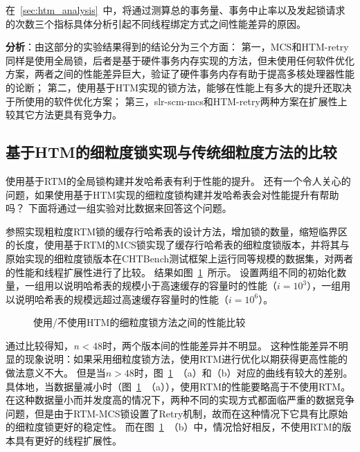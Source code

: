 在~\ref{sec:htm_analysis}~中，将通过测算总的事务量、事务中止率以及发起锁请求的次数三个指标具体分析引起不同线程绑定方式之间性能差异的原因。

\textbf{分析}：由这部分的实验结果得到的结论分为三个方面：
第一，MCS和HTM-retry同样是使用全局锁，后者是基于硬件事务内存实现的方法，但未使用任何软件优化方案，两者之间的性能差异巨大，验证了硬件事务内存有助于提高多核处理器性能的论断；
第二，使用基于HTM实现的锁方法，能够在性能上有多大的提升还取决于所使用的软件优化方案；
第三，slr-scm-mcs和HTM-retry两种方案在扩展性上较其它方法更具有竞争力。


\subsection{基于HTM的细粒度锁实现与传统细粒度方法的比较}
使用基于RTM的全局锁构建并发哈希表有利于性能的提升。
还有一个令人关心的问题，如果使用基于HTM实现的细粒度锁构建并发哈希表会对性能提升有帮助吗？
下面将通过一组实验对比数据来回答这个问题。

参照实现粗粒度RTM锁的缓存行哈希表的设计方法，增加锁的数量，缩短临界区的长度，使用基于RTM的MCS锁实现了缓存行哈希表的细粒度锁版本，并将其与原始实现的细粒度锁版本在CHTBench测试框架上运行同等规模的数据集，对两者的性能和线程扩展性进行了比较。
结果如图~\ref{fig:htm_fine_grained}~所示。
设置两组不同的初始化数量，一组用以说明哈希表的规模小于高速缓存的容量时的性能（$i = 10^3$），一组用以说明哈希表的规模远超过高速缓存容量时的性能（$i = 10 ^6$）。

\begin{figure}[htbp]
\centering
\caption{使用/不使用HTM的细粒度锁方法之间的性能比较}
\label{fig:htm_fine_grained}
\end{figure}

通过比较得知，\textit{n} < 48时，两个版本间的性能差异并不明显。
这种性能差异不明显的现象说明：如果采用细粒度锁方法，使用RTM进行优化以期获得更高性能的做法意义不大。
但是当$n > 48$时，图~\ref{fig:htm_fine_grained}~（a）和（b）对应的曲线有较大的差别。
具体地，当数据量减小时（图~\ref{fig:htm_fine_grained}~（a）），使用RTM的性能要略高于不使用RTM。
在这种数据量小而并发度高的情况下，两种不同的实现方式都面临严重的数据竞争问题，但是由于RTM-MCS锁设置了Retry机制，故而在这种情况下它具有比原始的细粒度锁更好的稳定性。
而在图~\ref{fig:htm_fine_grained}~（b）中，情况恰好相反，不使用RTM的版本具有更好的线程扩展性。


